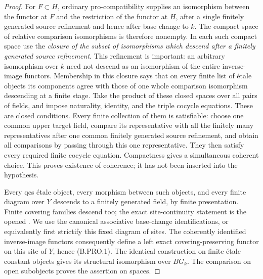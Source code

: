\begin{proof}
For \(F\subset H\), ordinary pro-compatibility supplies an
isomorphism between the functor at \(F\) and the restriction of
the functor at \(H\), after a single finitely generated source
refinement and hence after base change to \(k\). The compact
space of relative comparison isomorphisms is therefore nonempty.
In each such compact space use the \emph{closure of the subset
of isomorphisms which descend after a finitely generated source
refinement}. This refinement is important: an arbitrary isomorphism
over \(k\) need not descend as an isomorphism of the entire
inverse-image functors. Membership in this closure says that on
every finite list of étale objects its components agree with those
of one whole comparison isomorphism descending at a finite stage.
Take the product of these closed spaces over all pairs of fields, and
impose naturality, identity, and the triple cocycle equations.
These are closed conditions. Every finite collection of them is
satisfiable: choose one common upper target field, compare its
representative with all the finitely many representatives after
one common finitely generated source refinement, and obtain all
comparisons by passing through this one representative. They
then satisfy every required finite cocycle equation. Compactness
gives a simultaneous coherent choice. This proves existence of
coherence; it has not been inserted into the hypothesis.

Every qcs étale object, every morphism between such objects, and
every finite diagram over \(Y\) descends to a finitely generated
field, by finite presentation. Finite covering families descend
too; the exact site-continuity statement is the opened
\citep[Lemma~59.51.2, Tag~0EYL, together with
Lemma~32.10.1, Tag~01ZM]{StacksProject}. We use the canonical
associative base-change identifications, or equivalently first
strictify this fixed diagram of sites. The coherently identified
inverse-image functors consequently
define a left exact covering-preserving functor on this site of
\(Y\), hence (B.PRO.1). The identical construction on finite étale
constant objects gives its structural isomorphism over \(BG_k\).
The comparison on open subobjects proves the assertion on spaces.


\end{proof}
